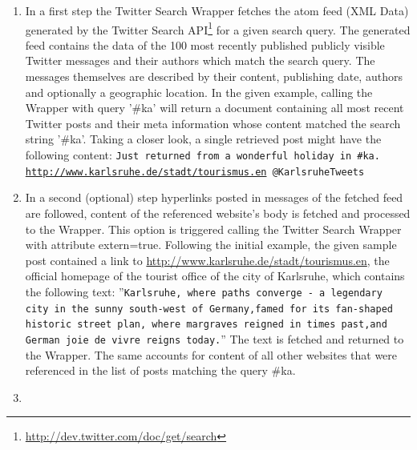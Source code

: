 \documentclass{llncs}
\begin{document}
\begin{enumerate}
  \item 
In a first step the Twitter Search Wrapper fetches the atom feed (XML Data)
generated by the Twitter Search
API\footnote{\url{http://dev.twitter.com/doc/get/search}} for a given
search query. The generated feed contains the data of the 100 most recently published
publicly visible Twitter messages and their authors which match the search query.
The messages themselves are described by their content, publishing date, authors
and optionally a geographic location.\linebreak\linebreak
In the given example, calling the Wrapper with query '\#ka' will return a
document containing all most recent Twitter posts and their meta information
whose content matched the search string '\#ka'. Taking a closer look, a single
retrieved post might have the following content: \newline\linebreak 
\texttt{Just returned from a wonderful holiday in \#ka.
\url{http://www.karlsruhe.de/stadt/tourismus.en} @KarlsruheTweets}
\linebreak
\item
In a second (optional) step hyperlinks posted in messages of the fetched
feed are followed, content of the referenced website's body is fetched and
processed to the Wrapper. This option is triggered calling the Twitter Search
Wrapper with attribute extern=true.\newline
\linebreak
Following the initial example, the given sample post contained a link to
\url{http://www.karlsruhe.de/stadt/tourismus.en}, the official homepage of the tourist office of the city of Karlsruhe, which contains the following
text:\newline
\linebreak
''\texttt{Karlsruhe, where paths converge - a legendary city in the sunny
south-west of Germany,\newline famed for its fan-shaped historic street plan,
where margraves reigned in times past,\newline and German joie de vivre reigns
today.}''\newline\linebreak
The text is fetched and returned to the Wrapper. The same accounts for
content of all other websites that were referenced in the list of posts matching
the query \#ka.\newline
\item

\end{enumerate}
\end{document}
